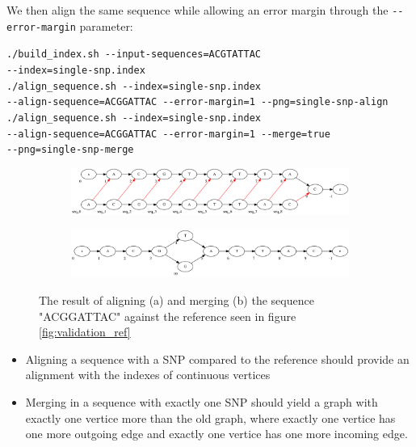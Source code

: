 \documentclass[thesis.tex]{subfiles}
\begin{document}
\clearpage\noindent
We then align the same sequence while allowing an error margin through the \texttt{-{}-error-margin} parameter:\\
\par\noindent
\texttt{./build\_index.sh -{}-input-sequences=ACGTATTAC\\
-{}-index=single-snp.index}\\
\texttt{./align\_sequence.sh -{}-index=single-snp.index\\
-{}-align-sequence=ACGGATTAC -{}-error-margin=1 -{}-png=single-snp-align}\\
\texttt{./align\_sequence.sh -{}-index=single-snp.index\\
-{}-align-sequence=ACGGATTAC -{}-error-margin=1 -{}-merge=true \\
-{}-png=single-snp-merge}\\
\begin{figure}[!h]
  \begin{mdframed}
  \begin{subfigure}[t]{\textwidth}
      \includegraphics[width=\textwidth]{output/single-snp-align.png}
    \subcaption{}
  \end{subfigure}
  \begin{subfigure}[t]{\textwidth}
      \includegraphics[width=\textwidth]{output/single-snp-merge.png}
    \subcaption{}
  \end{subfigure} 
\end{mdframed}
  \caption[Aligning and merging an SNP with \ref{fig:validation_ref} with a sufficient error margin]{The result of aligning (a) and merging (b) the sequence "ACGGATTAC" against the reference seen in figure \ref{fig:validation_ref}}
  \label{fig:validation_single_snp}
\end{figure}
\begin{itemize}
\item Aligning a sequence with a SNP compared to the reference should provide an alignment with the indexes of continuous vertices
\item Merging in a sequence with exactly one SNP should yield a graph with exactly one vertice more than the old graph, where exactly one vertice has one more outgoing edge and exactly one vertice has one more incoming edge.
\end{itemize}
\clearpage
\end{document}
